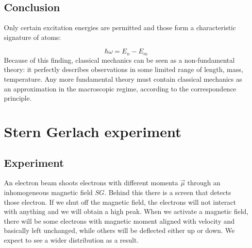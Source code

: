   \subsection{Conclusion}
  Only certain excitation energies are permitted and those form a characteristic signature of atoms:

  $$\hbar\omega = E_n-E_m$$
  \noindent
  Because of this finding, classical mechanics can be seen as a non-fundamental theory: it perfectly describes observations in some limited range of length, mass, temperature.
  Any more fundamental theory must contain classical mechanics as an approximation in the macroscopic regime, according to the correspondence principle.

\section{Stern Gerlach experiment}

  \subsection{Experiment}
  An electron beam shoots electrons with different momenta $\vec{\mu}$ through an inhomogeneous magnetic field $SG$.
  Behind this there is a screen that detects those electron. If we shut off the magnetic field, the electrons will not interact with anything and we will obtain a high peak. When we activate a magnetic field, there will be some electrons with magnetic moment aligned with velocity and basically left unchanged, while others will be deflected either up or down. We expect to see a wider distribution as a result.
  

